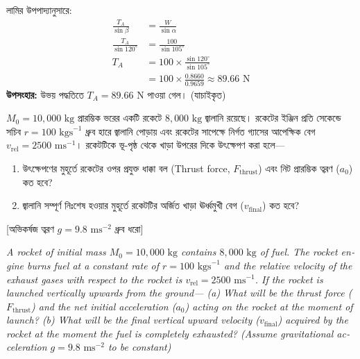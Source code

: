 \documentclass[12pt, a4paper]{article}
\begin{document}
\begin{tcolorbox}[solutionbox={সমাধান (Solution)}]
লামির উপপাদ্যানুসারে:
\begin{align*}
    \frac{T_A}{\sin \beta} &= \frac{W}{\sin \alpha} \\
    \frac{T_A}{\sin 120^\circ} &= \frac{100}{\sin 105^\circ} \\
    T_A &= 100 \times \frac{\sin 120^\circ}{\sin 105^\circ} \\
        &= 100 \times \frac{0.8660}{0.9659} \approx \mathbf{89.66}\text{ N}
\end{align*}
\textbf{উপসংহার:} উভয় পদ্ধতিতে $T_A = 89.66\text{ N}$ পাওয়া গেল। (যাচাইকৃত)
\end{tcolorbox}

\begin{tcolorbox}[questionbox={প্রশ্ন (Question) 9}]
\noindent
$M_0 = 10,000\text{ kg}$ প্রারম্ভিক ভরের একটি রকেটে $8,000\text{ kg}$ জ্বালানি রয়েছে। রকেটের ইঞ্জিন প্রতি সেকেন্ডে সচিব $r = 100\text{ kgs}^{-1}$ ধ্রুব হারে জ্বালানি পোড়ায় এবং রকেটের সাপেক্ষে নির্গত গ্যাসের আপেক্ষিক বেগ $v_{\text{rel}} = 2500\text{ ms}^{-1}$। রকেটটিকে ভূ-পৃষ্ঠ থেকে খাড়া উপরের দিকে উৎক্ষেপণ করা হলে—
\begin{enumerate}
    \item[(ক)] উৎক্ষেপণের মুহূর্তে রকেটের ওপর প্রযুক্ত ধাক্কা বল (Thrust force, $F_{\text{thrust}}$) এবং নিট প্রারম্ভিক ত্বরণ ($a_0$) কত হবে?
    \item[(খ)] জ্বালানি সম্পূর্ণ নিঃশেষ হওয়ার মুহূর্তে রকেটটির অর্জিত খাড়া ঊর্ধ্বমুখী বেগ ($v_{\text{final}}$) কত হবে?
\end{enumerate}
[অভিকর্ষজ ত্বরণ $g = 9.8\text{ ms}^{-2}$ ধ্রুব ধরো]

\vspace{0.8em}
\begin{english}
\noindent\textit{\color{darkgray}
A rocket of initial mass $M_0 = 10,000\text{ kg}$ contains $8,000\text{ kg}$ of fuel. The rocket engine burns fuel at a constant rate of $r = 100\text{ kgs}^{-1}$ and the relative velocity of the exhaust gases with respect to the rocket is $v_{\text{rel}} = 2500\text{ ms}^{-1}$. If the rocket is launched vertically upwards from the ground— 
(a) What will be the thrust force ($F_{\text{thrust}}$) and the net initial acceleration ($a_0$) acting on the rocket at the moment of launch? 
(b) What will be the final vertical upward velocity ($v_{\text{final}}$) acquired by the rocket at the moment the fuel is completely exhausted? (Assume gravitational acceleration $g = 9.8\text{ ms}^{-2}$ to be constant)
}
\end{english}
\end{tcolorbox}
\end{document}

